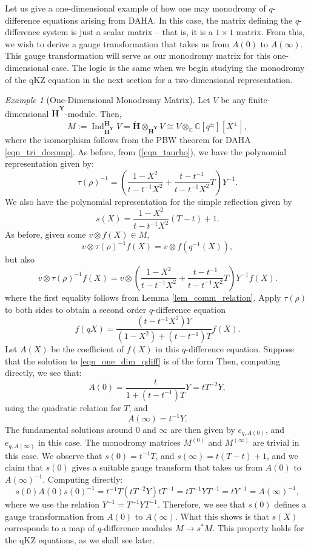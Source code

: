 \documentclass[a4paper]{report}
\theoremstyle{theorem}
\theoremstyle{definition}
\theoremstyle{remark}
\theoremstyle{proposition}
\theoremstyle{conjecture}
\theoremstyle{lemma}
\theoremstyle{corollary}
\theoremstyle{exercise}
\theoremstyle{example}
\newtheorem{example}{Example}
\newcommand{\C}{\mathbb{C}}
\newcommand{\on}{\operatorname}
\begin{document}
  Let us give a one-dimensional example of how one may monodromy of $q$-difference equations arising 
  from DAHA. In this case, the matrix defining the $q$-difference system 
  is just a scalar matrix -- that is, it is a $1\times 1$ matrix. From this, 
  we wish to derive a gauge transformation that takes us from 
  $A(0)$ to $A(\infty)$. This gauge transformation will serve as our 
  monodromy matrix for this one-dimensional case.
  The logic is the same when we begin studying the monodromy of the 
  qKZ equation in the next section for a two-dimensional representation.
  
  \begin{example}[One-Dimensional Monodromy Matrix]
      Let $V$ be any finite-dimensional $\mathbf{\dot{H}}^\mathbf{Y}$-module.
      Then, 
      $$M := \on{Ind}_{\mathbf{\dot{H}}^\mathbf{Y}}^{\mathbf{\ddot{\mathbf{H}}}} V = \ddot{\mathbf{H}} \otimes_{\mathbf{\dot{H}}^\mathbf{Y}} V \cong V \otimes_\C \C[q^\pm][X^\pm],$$
      where the isomorphism follows from the PBW theorem for DAHA \eqref{eqn_tri_decomp}.
      As before, from (\ref{eqn_taurho}), we have the polynomial 
      representation given by:
      $$\tau(\rho)^{-1} = \left(\frac{1-X^2}{t-t^{-1}X^2} + \frac{t-t^{-1}}{t-t^{-1}X^2}T\right)Y^{-1}.$$
      We also have the polynomial representation for the simple reflection given by
      $$s(X) = \frac{1-X^2}{t-t^{-1}X^2}(T-t)+1.$$
      As before, given some $v\otimes f(X) \in M$, 
      $$v \otimes \tau(\rho)^{-1} f(X) = v\otimes f(q^{-1}(X)),$$ 
      but also 
      $$v \otimes \tau(\rho)^{-1} f(X) = v \otimes \left(\frac{1-X^2}{t-t^{-1}X^2} + \frac{t-t^{-1}}{t-t^{-1}X^2}T\right)Y^{-1} f(X).$$
      where the first equality follows from Lemma \ref{lem_comm_relation}.
      Apply $\tau(\rho)$ to both sides to obtain a second order $q$-difference equation 
      \begin{equation}\label{eqn_one_dim_qdiff}
         f(qX) = \frac{(t-t^{-1}X^2)Y}{(1-X^2) + (t-t^{-1})T} f(X).
      \end{equation}
      Let $A(X)$ be the coefficient of $f(X)$ in this $q$-difference equation.
      Suppose that the solution to \eqref{eqn_one_dim_qdiff} is of the form 
      Then, computing directly, we see that:
      $$A(0) = \frac{t}{1+(t-t^{-1})T}Y = tT^{-2}Y,$$ using the quadratic 
      relation for $T$, and $$A(\infty) = t^{-1}Y.$$
      The fundamental solutions around $0$ and $\infty$ are then given by 
      $e_{q,A(0)}$, and $e_{q,A(\infty)}$ in this case.
      The monodromy matrices $M^{(0)}$ and 
      $M^{(\infty)}$ are trivial in this case.
      We observe that $s(0) = t^{-1}T$, and $s(\infty) = t(T-t)+1$, and we claim 
      that $s(0)$ gives a suitable
      gauge transform that takes us from $A(0)$ to $A(\infty)^{-1}$.
      Computing directly:
      $$s(0) A(0) s(0)^{-1} = t^{-1}T(tT^{-2}Y)tT^{-1} = tT^{-1}YT^{-1} = tY^{-1} = A(\infty)^{-1},$$
      where we use the relation $Y^{-1} = T^{-1}YT^{-1}$. 
      Therefore, we see that $s(0)$ defines a gauge transformation from $A(0)$ to $A(\infty)$. 
      What this shows is that $s(X)$ corresponds to a map of $q$-difference modules $M \to s^\ast M$.
      This property holds for the qKZ equations, as we shall see later.
  \end{example}
  
\end{document}
